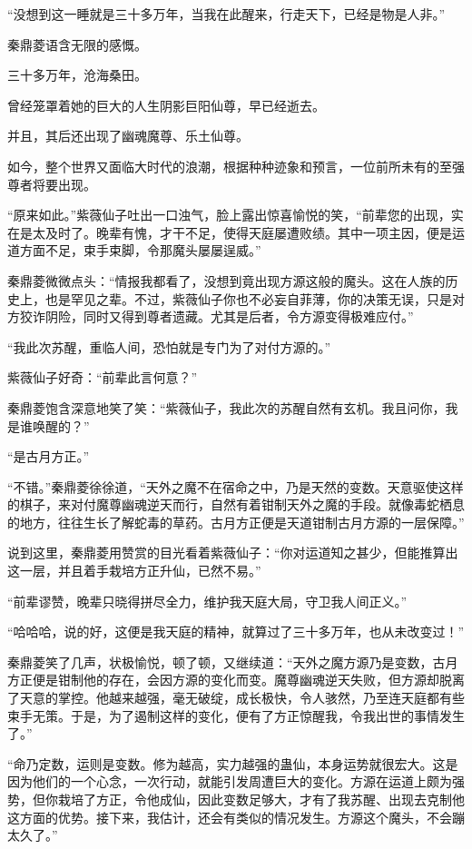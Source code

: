 \begin{this_body}
“没想到这一睡就是三十多万年，当我在此醒来，行走天下，已经是物是人非。”

秦鼎菱语含无限的感慨。

三十多万年，沧海桑田。

曾经笼罩着她的巨大的人生阴影巨阳仙尊，早已经逝去。

并且，其后还出现了幽魂魔尊、乐土仙尊。

如今，整个世界又面临大时代的浪潮，根据种种迹象和预言，一位前所未有的至强尊者将要出现。

“原来如此。”紫薇仙子吐出一口浊气，脸上露出惊喜愉悦的笑，“前辈您的出现，实在是太及时了。晚辈有愧，才干不足，使得天庭屡遭败绩。其中一项主因，便是运道方面不足，束手束脚，令那魔头屡屡逞威。”

秦鼎菱微微点头：“情报我都看了，没想到竟出现方源这般的魔头。这在人族的历史上，也是罕见之辈。不过，紫薇仙子你也不必妄自菲薄，你的决策无误，只是对方狡诈阴险，同时又得到尊者遗藏。尤其是后者，令方源变得极难应付。”

“我此次苏醒，重临人间，恐怕就是专门为了对付方源的。”

紫薇仙子好奇：“前辈此言何意？”

秦鼎菱饱含深意地笑了笑：“紫薇仙子，我此次的苏醒自然有玄机。我且问你，我是谁唤醒的？”

“是古月方正。”

“不错。”秦鼎菱徐徐道，“天外之魔不在宿命之中，乃是天然的变数。天意驱使这样的棋子，来对付魔尊幽魂逆天而行，自然有着钳制天外之魔的手段。就像毒蛇栖息的地方，往往生长了解蛇毒的草药。古月方正便是天道钳制古月方源的一层保障。”

说到这里，秦鼎菱用赞赏的目光看着紫薇仙子：“你对运道知之甚少，但能推算出这一层，并且着手栽培方正升仙，已然不易。”

“前辈谬赞，晚辈只晓得拼尽全力，维护我天庭大局，守卫我人间正义。”

“哈哈哈，说的好，这便是我天庭的精神，就算过了三十多万年，也从未改变过！”

秦鼎菱笑了几声，状极愉悦，顿了顿，又继续道：“天外之魔方源乃是变数，古月方正便是钳制他的存在，会因方源的变化而变。魔尊幽魂逆天失败，但方源却脱离了天意的掌控。他越来越强，毫无破绽，成长极快，令人骇然，乃至连天庭都有些束手无策。于是，为了遏制这样的变化，便有了方正惊醒我，令我出世的事情发生了。”

“命乃定数，运则是变数。修为越高，实力越强的蛊仙，本身运势就很宏大。这是因为他们的一个心念，一次行动，就能引发周遭巨大的变化。方源在运道上颇为强势，但你栽培了方正，令他成仙，因此变数足够大，才有了我苏醒、出现去克制他这方面的优势。接下来，我估计，还会有类似的情况发生。方源这个魔头，不会蹦太久了。”


\end{this_body}
